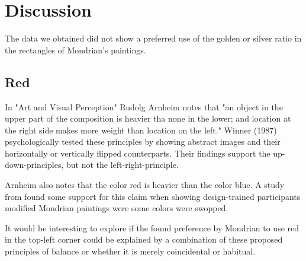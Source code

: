 \section{Discussion} \label{conclusion}




The data we obtained did not show a preferred use of the golden or silver ratio
in the rectangles of Mondrian's paintings.





\subsection{Red}

In "Art and Visual Perception" Rudolg Arnheim \cite{Arnheim1965} notes that "an
object in the upper part of the composition is heavier tha none in the lower;
and location at the right side makes more weight than location on the left."
Winner (1987) \cite{Winner1987} psychologically tested these principles by
showing abstract images and their horizontally or vertically flipped
counterparts. Their findings support the up-down-principles, but not the
left-right-principle.

Arnheim also notes that the color red is heavier than the color blue. A study
from \cite{Locher2005} found some support for this claim when showing
design-trained participants modified Mondrian paintings were some colors were
swopped.

It would be interesting to explore if the found preference by Mondrian to use
red in the top-left corner could be explained by a combination of these proposed
principles of balance or whether it is merely coincidental or habitual.




